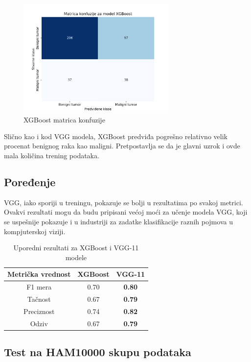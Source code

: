 \documentclass{article}
\begin{document}
\begin{figure}[H]
    \centering
    \includegraphics[width=0.7\textwidth]{rezultati/XGBoost_matrica_konfuzije.png} 
    \caption{XGBoost matrica konfuzije} 
    \label{XGBoost matrica konfuzije}
\end{figure}

Slično kao i kod VGG modela, XGBoost predviđa pogrešno relativno velik procenat benignog raka kao maligni. Pretpostavlja se da je glavni uzrok i ovde mala količina trening podataka.

\subsection{Poređenje}

VGG, iako sporiji u treningu, pokazuje se bolji u rezultatima po svakoj metrici. Ovakvi rezultati mogu da budu pripisani većoj moći za učenje modela VGG, koji se uspešnije pokazuje i u industriji za zadatke klasifikacije raznih pojmova u kompjuterskoj viziji.

\begin{table}[H]
\centering
\begin{tabular}{|c|c|c|}
\hline
\textbf{Metrička vrednost} & \textbf{XGBoost} & \textbf{VGG-11} \\ \hline
F1 mera & 0.70 & \textbf{0.80} \\ \hline
Tačnost & 0.67 & \textbf{0.79} \\ \hline
Preciznost & 0.74 & \textbf{0.82} \\ \hline
Odziv & 0.67 & \textbf{0.79} \\ \hline
\end{tabular}
\caption{Uporedni rezultati za XGBoost i VGG-11 modele}
\label{tab:comparison_performance}
\end{table}

\subsection{Test na HAM10000 skupu podataka}
\end{document}
